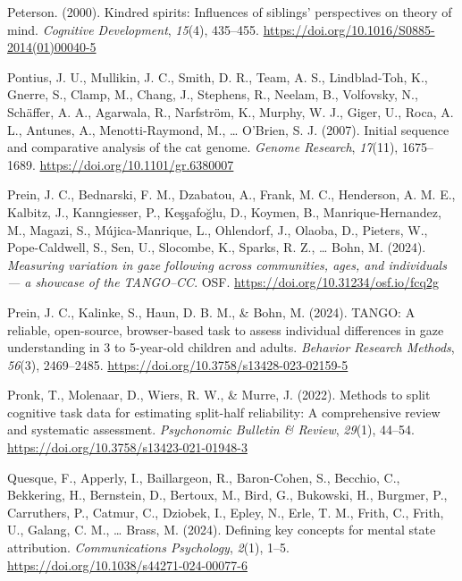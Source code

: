 \documentclass[
]{scrbook}
\newlength{\cslhangindent}
\newenvironment{CSLReferences}[2] %
 {\begin{list}{}{%
  \setlength{\itemindent}{0pt}
  \setlength{\leftmargin}{0pt}
  \setlength{\parsep}{0pt}
  \ifodd #1
   \setlength{\leftmargin}{\cslhangindent}
   \setlength{\itemindent}{-1\cslhangindent}
  \fi
  \setlength{\itemsep}{#2\baselineskip}}}
 {\end{list}}
\begin{document}
\begin{CSLReferences}{1}{0}
Peterson. (2000). Kindred spirits: {Influences} of siblings' perspectives on theory of mind. \emph{Cognitive Development}, \emph{15}(4), 435--455. \url{https://doi.org/10.1016/S0885-2014(01)00040-5}

Pontius, J. U., Mullikin, J. C., Smith, D. R., Team, A. S., Lindblad-Toh, K., Gnerre, S., Clamp, M., Chang, J., Stephens, R., Neelam, B., Volfovsky, N., Schäffer, A. A., Agarwala, R., Narfström, K., Murphy, W. J., Giger, U., Roca, A. L., Antunes, A., Menotti-Raymond, M., \ldots{} O'Brien, S. J. (2007). Initial sequence and comparative analysis of the cat genome. \emph{Genome Research}, \emph{17}(11), 1675--1689. \url{https://doi.org/10.1101/gr.6380007}

Prein, J. C., Bednarski, F. M., Dzabatou, A., Frank, M. C., Henderson, A. M. E., Kalbitz, J., Kanngiesser, P., Keşşafoğlu, D., Koymen, B., Manrique-Hernandez, M., Magazi, S., Mújica-Manrique, L., Ohlendorf, J., Olaoba, D., Pieters, W., Pope-Caldwell, S., Sen, U., Slocombe, K., Sparks, R. Z., \ldots{} Bohn, M. (2024). \emph{Measuring variation in gaze following across communities, ages, and individuals --- a showcase of the {TANGO}--{CC}}. OSF. \url{https://doi.org/10.31234/osf.io/fcq2g}

Prein, J. C., Kalinke, S., Haun, D. B. M., \& Bohn, M. (2024). {TANGO}: {A} reliable, open-source, browser-based task to assess individual differences in gaze understanding in 3 to 5-year-old children and adults. \emph{Behavior Research Methods}, \emph{56}(3), 2469--2485. \url{https://doi.org/10.3758/s13428-023-02159-5}

Pronk, T., Molenaar, D., Wiers, R. W., \& Murre, J. (2022). Methods to split cognitive task data for estimating split-half reliability: {A} comprehensive review and systematic assessment. \emph{Psychonomic Bulletin \& Review}, \emph{29}(1), 44--54. \url{https://doi.org/10.3758/s13423-021-01948-3}

Quesque, F., Apperly, I., Baillargeon, R., Baron-Cohen, S., Becchio, C., Bekkering, H., Bernstein, D., Bertoux, M., Bird, G., Bukowski, H., Burgmer, P., Carruthers, P., Catmur, C., Dziobek, I., Epley, N., Erle, T. M., Frith, C., Frith, U., Galang, C. M., \ldots{} Brass, M. (2024). Defining key concepts for mental state attribution. \emph{Communications Psychology}, \emph{2}(1), 1--5. \url{https://doi.org/10.1038/s44271-024-00077-6}


\end{CSLReferences}
\end{document}
